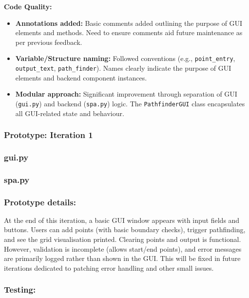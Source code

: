 \textbf{Code Quality:}
\begin{itemize}
	\item \textbf{Annotations added:} Basic comments added outlining the purpose of GUI elements and methods. Need to ensure comments aid future maintenance as per previous feedback.
	\item \textbf{Variable/Structure naming:} Followed conventions (e.g., \verb|point_entry|, \verb|output_text|, \verb|path_finder|). Names clearly indicate the purpose of GUI elements and backend component instances.
	\item \textbf{Modular approach:} Significant improvement through separation of GUI (\verb|gui.py|) and backend (\verb|spa.py|) logic. The \verb|PathfinderGUI| class encapsulates all GUI-related state and behaviour.
\end{itemize}

\newpage %

\subsubsection*{Prototype: Iteration 1}
\subsubsection{gui.py}


\subsubsection{spa.py}



\subsubsection{Prototype details:}
At the end of this iteration, a basic GUI window appears with input fields and buttons. Users can add points (with basic boundary checks), trigger pathfinding, and see the grid visualisation printed. Clearing points and output is functional. However, validation is incomplete (allows start/end points), and error messages are primarily logged rather than shown in the GUI. This will be fixed in future iterations dedicated to patching error handling and other small issues.

\subsubsection{Testing:}

